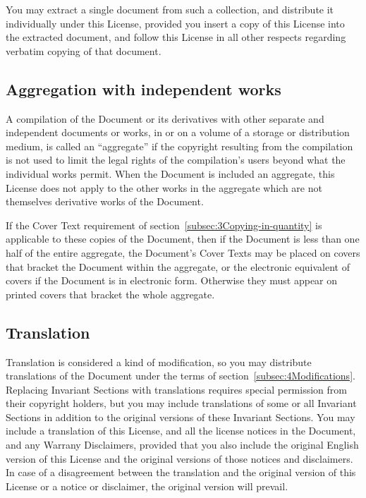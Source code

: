{\tiny{}You may extract a single document from such a collection,
and distribute it individually under this License, provided you insert
a copy of this License into the extracted document, and follow this
License in all other respects regarding verbatim copying of that document.}{\tiny\par}

\subsection*{{\tiny{}Aggregation with independent works}}

{\tiny{}A compilation of the Document or its derivatives with other
separate and independent documents or works, in or on a volume of
a storage or distribution medium, is called an “aggregate” if the
copyright resulting from the compilation is not used to limit the
legal rights of the compilation's users beyond what the individual
works permit. When the Document is included an aggregate, this License
does not apply to the other works in the aggregate which are not themselves
derivative works of the Document.}{\tiny\par}

{\tiny{}If the Cover Text requirement of section~\ref{subsec:3Copying-in-quantity}
is applicable to these copies of the Document, then if the Document
is less than one half of the entire aggregate, the Document's Cover
Texts may be placed on covers that bracket the Document within the
aggregate, or the electronic equivalent of covers if the Document
is in electronic form. Otherwise they must appear on printed covers
that bracket the whole aggregate.}{\tiny\par}

\subsection*{{\tiny{}Translation}}

{\tiny{}Translation is considered a kind of modification, so you may
distribute translations of the Document under the terms of section~\ref{subsec:4Modifications}.
Replacing Invariant Sections with translations requires special permission
from their copyright holders, but you may include translations of
some or all Invariant Sections in addition to the original versions
of these Invariant Sections. You may include a translation of this
License, and all the license notices in the Document, and any Warrany
Disclaimers, provided that you also include the original English version
of this License and the original versions of those notices and disclaimers.
In case of a disagreement between the translation and the original
version of this License or a notice or disclaimer, the original version
will prevail.}{\tiny\par}

